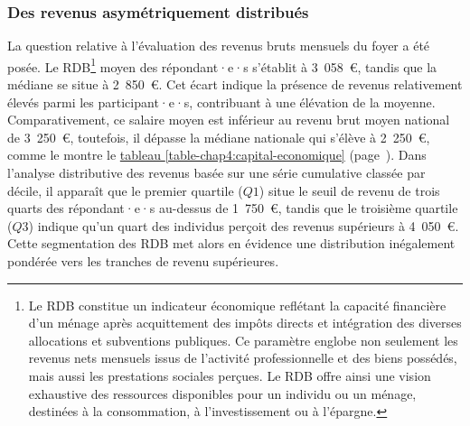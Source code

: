 \begin{refsegment}
\subsubsection*{Des revenus asymétriquement distribués
    \label{chap4:capital-economique-revenu}
    }

La question relative à l'évaluation des revenus bruts mensuels du foyer a été posée. Le \acrfull{RDB}\footnote{
    Le \acrfull{RDB} constitue un indicateur économique reflétant la capacité financière d’un ménage après acquittement des impôts directs et intégration des diverses allocations et subventions publiques. Ce paramètre englobe non seulement les revenus nets mensuels issus de l'activité professionnelle et des biens possédés, mais aussi les prestations sociales perçues. Le \acrshort{RDB} offre ainsi une vision exhaustive des ressources disponibles pour un individu ou un ménage, destinées à la consommation, à l’investissement ou à l’épargne.
} moyen des répondant·e·s s'établit à 3~058~\euro, tandis que la médiane se situe à 2~850~\euro. Cet écart indique la présence de revenus relativement élevés parmi les participant·e·s, contribuant à une élévation de la moyenne. Comparativement, ce salaire moyen est inférieur au revenu brut moyen national de 3~250~\euro, toutefois, il dépasse la médiane nationale qui s'élève à 2~250~\euro, comme le montre le \hyperref[table-chap4:capital-economique]{tableau \ref{table-chap4:capital-economique}} (page~\pageref{table-chap4:capital-economique}). Dans l'analyse distributive des revenus basée sur une série cumulative classée par décile, il apparaît que le premier quartile (\(Q1\)) situe le seuil de revenu de trois quarts des répondant·e·s au-dessus de 1~750~\euro, tandis que le troisième quartile (\(Q3\)) indique qu'un quart des individus perçoit des revenus supérieurs à 4~050~\euro. Cette segmentation des \acrshort{RDB} met alors en évidence une distribution inégalement pondérée vers les tranches de revenu supérieures.%


\end{refsegment}

